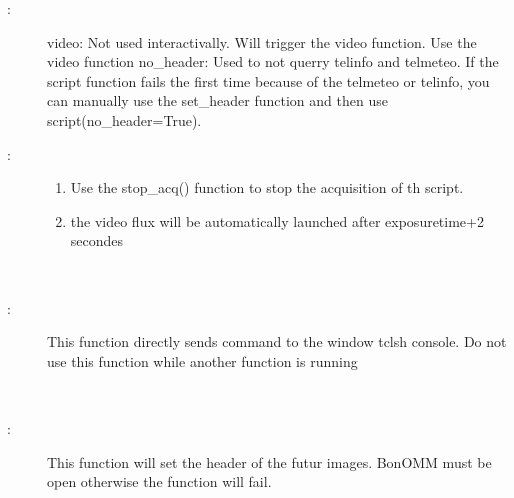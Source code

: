 \documentclass[letterpaper,10pt,english]{sphinxmanual}
\begin{document}
\begin{fulllineitems}
\begin{fulllineitems}
\begin{description}
\item[{:}] \leavevmode
\textendash{}video\textendash{}: Not used interactivally. Will trigger the video function. Use the video function
\textendash{}no\_header: Used to not querry telinfo and telmeteo. If the script function fails the first time because of the telmeteo or telinfo, you can manually use the set\_header function and then use script(no\_header=True).

\item[{:}] \leavevmode\begin{enumerate}
\item {} 
Use the stop\_acq() function to stop the acquisition of th script.

\item {} 
the video flux will be automatically launched after exposuretime+2 secondes

\end{enumerate}

\end{description}

\end{fulllineitems}


\begin{fulllineitems}
\label{\detokenize{index:python_andor.command.send}}~\begin{description}
\item[{:}] \leavevmode
This function directly sends command to the window tclsh console. Do not use this function while another function is running

\end{description}

\end{fulllineitems}


\begin{fulllineitems}
\label{\detokenize{index:python_andor.command.set_header}}~\begin{description}
\item[{:}] \leavevmode
This function will set the header of the futur images. BonOMM must be open otherwise the function will fail.


\end{description}
\end{fulllineitems}
\end{fulllineitems}
\end{document}
